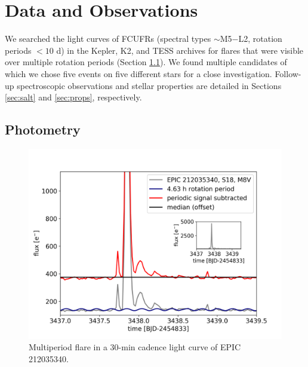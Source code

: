 \documentclass[fleqn,usenatbib,letters]{mnras}%
\newcommand{\FD}{EPIC 212035340} %
\begin{document}
\section{Data and Observations}
\label{sec:data}
We searched the light curves of FCUFRs (spectral types $\sim$M5$-$L2, rotation periods $< 10$ d) in the Kepler, K2, and TESS archives for flares that were visible over multiple rotation periods (Section \ref{sec:photometry}). We found multiple candidates of which we chose five events on five different stars for a close investigation. Follow-up spectroscopic observations and stellar properties are detailed in Sections \ref{sec:salt} and \ref{sec:props}, respectively.
%
\subsection{Photometry}
\label{sec:photometry}

\begin{figure}
	\includegraphics[width=\columnwidth]{figures/EPIC212035340_inset.png}
    \caption{Multiperiod flare in a 30-min cadence light curve of \FD.}
    \label{fig:\FD}
\end{figure}
\end{document}
